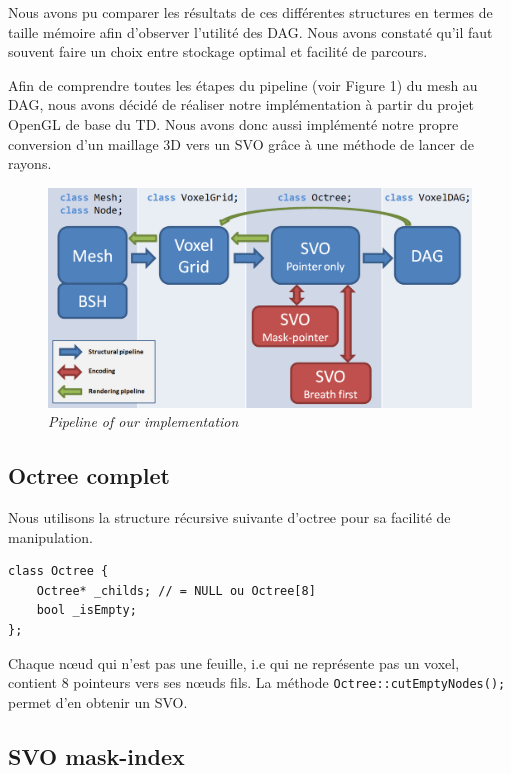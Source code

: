 \documentclass[a4paper]{article}
\begin{document}
Nous avons pu comparer les résultats de ces différentes structures en termes de taille mémoire afin d'observer l'utilité des DAG. Nous avons constaté qu'il faut souvent faire un choix entre stockage optimal et facilité de parcours.


Afin de comprendre toutes les étapes du pipeline (voir Figure 1) du mesh au DAG, nous avons décidé de réaliser notre implémentation à partir du projet OpenGL de base du TD. Nous avons donc aussi implémenté notre propre conversion d’un maillage 3D vers un SVO grâce à une méthode de lancer de rayons.

\begin{figure}
\centering
\includegraphics[width=1\textwidth]{ClassGraph.png}
\caption{\label{fig:triceratops}\textit{Pipeline of our implementation}}
\end{figure}

\subsection{Octree complet}

Nous utilisons la structure récursive suivante d’octree pour sa facilité de manipulation.

\begin{lstlisting}
class Octree {
	Octree* _childs; // = NULL ou Octree[8]
	bool _isEmpty;
};
\end{lstlisting}

Chaque nœud qui n’est pas une feuille, i.e qui ne représente pas un voxel, contient 8 pointeurs vers ses nœuds fils. La méthode \texttt{Octree::cutEmptyNodes();} permet d’en obtenir un SVO. 

\subsection{SVO mask-index}
\end{document}
